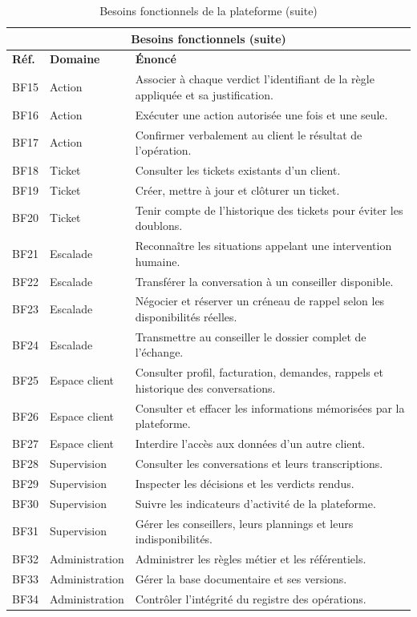 \newpage

\begin{table}[H]
\centering
\renewcommand{\arraystretch}{1.2}
\begin{tabular}{|p{1.3cm}|p{3.4cm}|p{9.2cm}|}
\hline
\multicolumn{3}{|c|}{\textbf{Besoins fonctionnels (suite)}} \\
\hline
\textbf{Réf.} & \textbf{Domaine} & \textbf{Énoncé} \\
\hline
BF15 & Action & Associer à chaque verdict l'identifiant de la règle appliquée et sa justification. \\
\hline
BF16 & Action & Exécuter une action autorisée une fois et une seule. \\
\hline
BF17 & Action & Confirmer verbalement au client le résultat de l'opération. \\
\hline
BF18 & Ticket & Consulter les tickets existants d'un client. \\
\hline
BF19 & Ticket & Créer, mettre à jour et clôturer un ticket. \\
\hline
BF20 & Ticket & Tenir compte de l'historique des tickets pour éviter les doublons. \\
\hline
BF21 & Escalade & Reconnaître les situations appelant une intervention humaine. \\
\hline
BF22 & Escalade & Transférer la conversation à un conseiller disponible. \\
\hline
BF23 & Escalade & Négocier et réserver un créneau de rappel selon les disponibilités réelles. \\
\hline
BF24 & Escalade & Transmettre au conseiller le dossier complet de l'échange. \\
\hline
BF25 & Espace client & Consulter profil, facturation, demandes, rappels et historique des conversations. \\
\hline
BF26 & Espace client & Consulter et effacer les informations mémorisées par la plateforme. \\
\hline
BF27 & Espace client & Interdire l'accès aux données d'un autre client. \\
\hline
BF28 & Supervision & Consulter les conversations et leurs transcriptions. \\
\hline
BF29 & Supervision & Inspecter les décisions et les verdicts rendus. \\
\hline
BF30 & Supervision & Suivre les indicateurs d'activité de la plateforme. \\
\hline
BF31 & Supervision & Gérer les conseillers, leurs plannings et leurs indisponibilités. \\
\hline
BF32 & Administration & Administrer les règles métier et les référentiels. \\
\hline
BF33 & Administration & Gérer la base documentaire et ses versions. \\
\hline
BF34 & Administration & Contrôler l'intégrité du registre des opérations. \\
\hline
\end{tabular}
\caption{Besoins fonctionnels de la plateforme (suite)}
\label{tab:bf-suite}
\end{table}

